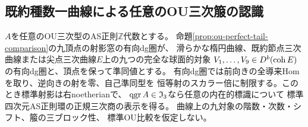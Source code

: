 \subsection{既約種数一曲線による任意のOU三次箙の認識}
\begin{theorem}[箙を指定しない既約種数一曲線窓]
\label{thm:ou-any-quiver-elliptic-window}
$A$を任意のOU三次型のAS正則$\mathbb Z$代数とする。
命題\ref{prop:ou-perfect-tail-comparison}の九頂点の射影窓の有向dg圏が、
滑らかな楕円曲線、既約節点三次曲線または尖点三次曲線$E$上の九つの完全な球面的対象
$V_1,\ldots,V_9\in D^b(\operatorname{coh} E)$の有向dg圏と、頂点を保って準同値とする。
有向dg圏では前向きの全導来Homを取り、逆向きの射を零、自己準同型を
恒等射のスカラー倍に制限する。このとき標準射影は右noetherianで、
$\operatorname{qgr} A\in\mathfrak I_3$なら任意の内在的標識について
標準四次元AS正則環の正規三次商の表示を得る。
曲線上の九対象の階数・次数・シフト、箙の三ブロック性、
標準OU比較を仮定しない。
\end{theorem}
